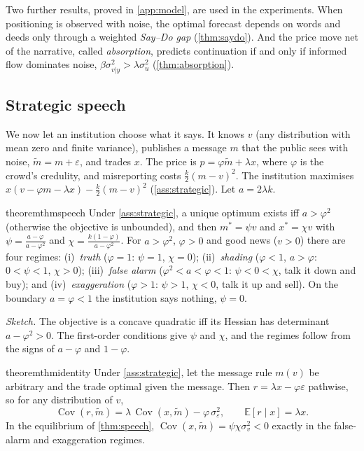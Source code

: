 \documentclass{article}
\theoremstyle{plain}
\theoremstyle{definition}
\theoremstyle{remark}
\newcommand{\E}{\mathbb{E}}
\DeclareMathOperator{\Cov}{Cov}
\begin{document}
Two further results, proved in \cref{app:model}, are used in the experiments. When positioning is observed with noise, the optimal forecast depends on words and deeds only through a weighted \emph{Say--Do gap} (\cref{thm:saydo}). And the price move net of the narrative, called \emph{absorption}, predicts continuation if and only if informed flow dominates noise, $\beta\sigma^2_{v|y}>\lambda\sigma_u^2$ (\cref{thm:absorption}).

\subsection{Strategic speech}\label{sec:strategic}

We now let an institution choose what it says. It knows $v$ (any distribution with mean zero and finite variance), publishes a message $m$ that the public sees with noise, $\tilde m=m+\varepsilon$, and trades $x$. The price is $p=\varphi\tilde m+\lambda x$, where $\varphi$ is the crowd's credulity, and misreporting costs $\frac k2(m-v)^2$. The institution maximises $x(v-\varphi m-\lambda x)-\frac k2(m-v)^2$ (\cref{ass:strategic}). Let $a=2\lambda k$.

\begin{restatable}{theorem}{thmspeech}\label{thm:speech}\label{cor:taxonomy}
Under \cref{ass:strategic}, a unique optimum exists iff $a>\varphi^2$ (otherwise the objective is unbounded), and then $m^\ast=\psi v$ and $x^\ast=\chi v$ with $\psi=\frac{a-\varphi}{a-\varphi^2}$ and $\chi=\frac{k(1-\varphi)}{a-\varphi^2}$. For $a>\varphi^2$, $\varphi>0$ and good news ($v>0$) there are four regimes: (i)~\emph{truth} ($\varphi=1$: $\psi=1$, $\chi=0$); (ii)~\emph{shading} ($\varphi<1$, $a>\varphi$: $0<\psi<1$, $\chi>0$); (iii)~\emph{false alarm} ($\varphi^2<a<\varphi<1$: $\psi<0<\chi$, talk it down and buy); and (iv)~\emph{exaggeration} ($\varphi>1$: $\psi>1$, $\chi<0$, talk it up and sell). On the boundary $a=\varphi<1$ the institution says nothing, $\psi=0$.
\end{restatable}

\emph{Sketch.} The objective is a concave quadratic iff its Hessian has determinant $a-\varphi^2>0$. The first-order conditions give $\psi$ and $\chi$, and the regimes follow from the signs of $a-\varphi$ and $1-\varphi$.

\begin{restatable}{theorem}{thmidentity}\label{thm:identity}
Under \cref{ass:strategic}, let the message rule $m(v)$ be arbitrary and the trade optimal given the message. Then $r=\lambda x-\varphi\varepsilon$ pathwise, so for any distribution of $v$,
\[
  \Cov(r,\tilde m)=\lambda\,\Cov(x,\tilde m)-\varphi\,\sigma_\varepsilon^2,\qquad \E[r\mid x]=\lambda x .
\]
In the equilibrium of \cref{thm:speech}, $\Cov(x,\tilde m)=\psi\chi\sigma_v^2<0$ exactly in the false-alarm and exaggeration regimes.
\end{restatable}
\end{document}
